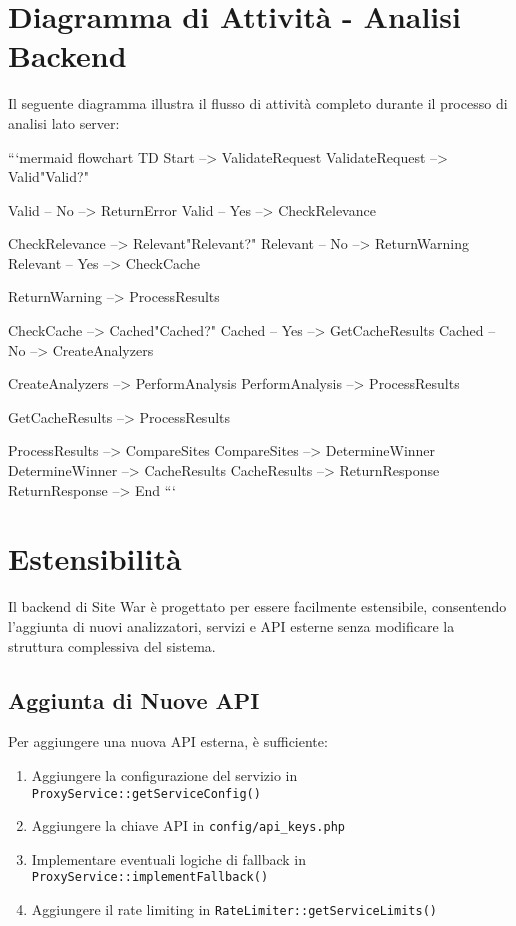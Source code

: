\section{Diagramma di Attività - Analisi Backend}
Il seguente diagramma illustra il flusso di attività completo durante il processo di analisi lato server:

```mermaid
flowchart TD
    Start --> ValidateRequest
    ValidateRequest --> Valid{"Valid?"}
    
    Valid -- No --> ReturnError
    Valid -- Yes --> CheckRelevance
    
    CheckRelevance --> Relevant{"Relevant?"}
    Relevant -- No --> ReturnWarning
    Relevant -- Yes --> CheckCache
    
    ReturnWarning --> ProcessResults
    
    CheckCache --> Cached{"Cached?"}
    Cached -- Yes --> GetCacheResults
    Cached -- No --> CreateAnalyzers
    
    CreateAnalyzers --> PerformAnalysis
    PerformAnalysis --> ProcessResults
    
    GetCacheResults --> ProcessResults
    
    ProcessResults --> CompareSites
    CompareSites --> DetermineWinner
    DetermineWinner --> CacheResults
    CacheResults --> ReturnResponse
    ReturnResponse --> End
```

\section{Estensibilità}
Il backend di Site War è progettato per essere facilmente estensibile, consentendo l'aggiunta di nuovi analizzatori, servizi e API esterne senza modificare la struttura complessiva del sistema.

\subsection{Aggiunta di Nuove API}
Per aggiungere una nuova API esterna, è sufficiente:
\begin{enumerate}
    \item Aggiungere la configurazione del servizio in \texttt{ProxyService::getServiceConfig()}
    \item Aggiungere la chiave API in \texttt{config/api\_keys.php}
    \item Implementare eventuali logiche di fallback in \texttt{ProxyService::implementFallback()}
    \item Aggiungere il rate limiting in \texttt{RateLimiter::getServiceLimits()}
\end{enumerate}

